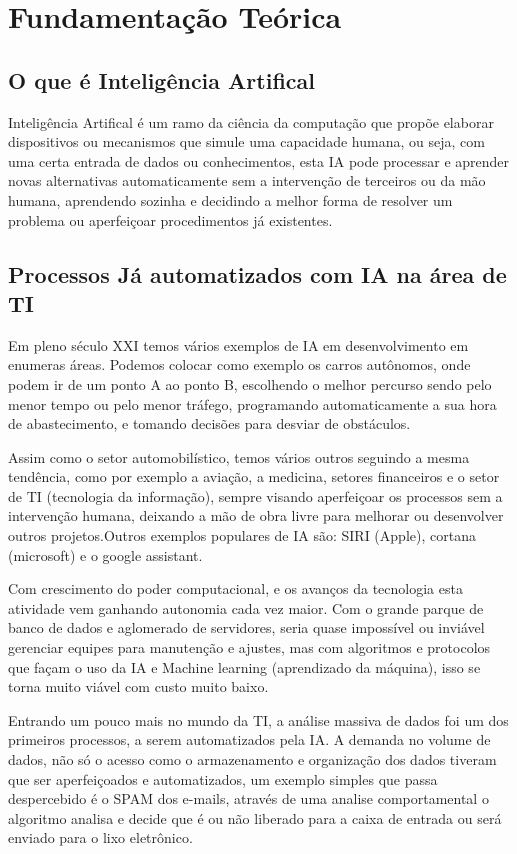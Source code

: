 \chapter{Fundamentação Teórica}
\section{O que é Inteligência Artifical}
Inteligência Artifical é um ramo da ciência da computação que propõe elaborar dispositivos ou mecanismos que simule uma capacidade humana, ou seja, com uma certa entrada de dados ou conhecimentos, esta IA pode processar e aprender novas alternativas automaticamente sem a intervenção de terceiros ou da mão humana, aprendendo sozinha e decidindo a melhor forma de resolver um problema ou aperfeiçoar procedimentos já existentes. 

\section{Processos Já automatizados com IA na área de TI}
	Em pleno século XXI temos vários exemplos de IA em desenvolvimento em enumeras áreas. Podemos colocar como exemplo os carros autônomos, onde podem ir de um ponto A ao ponto B, escolhendo o melhor percurso sendo pelo menor tempo ou pelo menor tráfego, programando automaticamente a sua hora de abastecimento, e tomando decisões para desviar de obstáculos.
	
	Assim como o setor automobilístico, temos vários outros seguindo a mesma tendência, como por exemplo a aviação, a medicina, setores financeiros e o setor de TI (tecnologia da informação), sempre visando aperfeiçoar os processos sem a intervenção humana, deixando a mão de obra livre para melhorar ou desenvolver outros projetos.Outros exemplos populares de IA são: SIRI (Apple), cortana (microsoft) e o google assistant. 
	
	Com crescimento do poder computacional, e os avanços da tecnologia esta atividade vem ganhando autonomia cada vez maior. Com o grande parque de banco de dados e aglomerado de servidores, seria quase impossível ou inviável gerenciar equipes para manutenção e ajustes, mas com algoritmos e protocolos que façam o uso da IA e Machine learning (aprendizado da máquina), isso se torna muito viável com custo muito baixo.
	
	
	Entrando um pouco mais no mundo da TI, a análise massiva de dados  foi um dos primeiros processos, a serem automatizados pela IA. A demanda no volume de dados, não só o acesso como o armazenamento e organização dos dados tiveram que ser aperfeiçoados e automatizados, um exemplo simples que passa despercebido  é o SPAM dos e-mails, através de uma analise comportamental o algoritmo analisa e decide que é ou não liberado para a caixa de entrada ou será enviado para o lixo eletrônico. 


